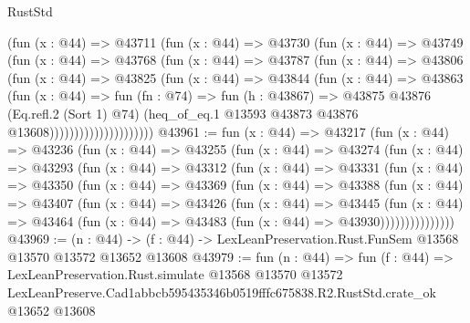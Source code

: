\begin{lexlean}{RustStd}
\begin{coremodule}
                        (fun (x : @44) =>
                        @43711
                          (fun (x : @44) =>
                          @43730
                            (fun (x : @44) =>
                            @43749
                              (fun (x : @44) =>
                              @43768
                                (fun (x : @44) =>
                                @43787
                                  (fun (x : @44) =>
                                  @43806
                                    (fun (x : @44) =>
                                    @43825
                                      (fun (x : @44) =>
                                      @43844
                                        (fun (x : @44) =>
                                        @43863
                                          (fun (x : @44) =>
                                          fun (fn : @74) =>
                                          fun (h : @43867) =>
                                          @43875
                                            @43876
                                            (Eq.refl.{2} (Sort 1) @74)
                                            (heq_of_eq.{1}
                                              @13593
                                              @43873
                                              @43876
                                              @13608)))))))))))))))))))))
@43961 := fun (x : @44) =>
  @43217
    (fun (x : @44) =>
    @43236
      (fun (x : @44) =>
      @43255
        (fun (x : @44) =>
        @43274
          (fun (x : @44) =>
          @43293
            (fun (x : @44) =>
            @43312
              (fun (x : @44) =>
              @43331
                (fun (x : @44) =>
                @43350
                  (fun (x : @44) =>
                  @43369
                    (fun (x : @44) =>
                    @43388
                      (fun (x : @44) =>
                      @43407
                        (fun (x : @44) =>
                        @43426
                          (fun (x : @44) =>
                          @43445
                            (fun (x : @44) =>
                            @43464 (fun (x : @44) => @43483 (fun (x : @44) => @43930)))))))))))))))
@43969 := (n : @44) ->
  (f : @44) -> LexLeanPreservation.Rust.FunSem @13568 @13570 @13572 @13652 @13608
@43979 := fun (n : @44) =>
  fun (f : @44) =>
  LexLeanPreservation.Rust.simulate
    @13568
    @13570
    @13572
    LexLeanPreserve.Cad1abbcb595435346b0519fffc675838.R2.RustStd.crate_ok
    @13652
    @13608
\end{coremodule}
\end{lexlean}
